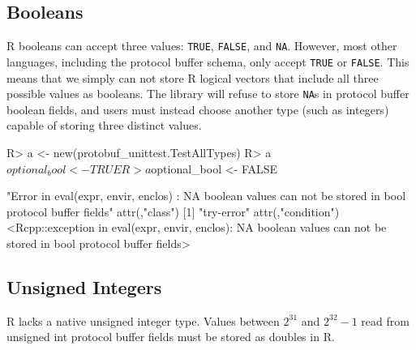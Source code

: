 \documentclass[article]{jss}
\begin{document}
\subsection{Booleans}

R booleans can accept three values: \texttt{TRUE}, \texttt{FALSE}, and
\texttt{NA}.  However, most other languages, including the protocol
buffer schema, only accept \texttt{TRUE} or \texttt{FALSE}.  This means
that we simply can not store R logical vectors that include all three
possible values as booleans.  The library will refuse to store
\texttt{NA}s in protocol buffer boolean fields, and users must instead
choose another type (such as integers) capable of storing three
distinct values.


\begin{Schunk}
\begin{Sinput}
R> a <- new(protobuf_unittest.TestAllTypes)
R> a$optional_bool <- TRUE
R> a$optional_bool <- FALSE
\end{Sinput}
\end{Schunk}
\begin{Schunk}
\end{Schunk}
\begin{Schunk}
\begin{Soutput}
[1] "Error in eval(expr, envir, enclos) : \n  NA boolean values can not be stored in bool protocol buffer fields\n"
attr(,"class")
[1] "try-error"
attr(,"condition")
<Rcpp::exception in eval(expr, envir, enclos): NA boolean values can not be stored in bool protocol buffer fields>
\end{Soutput}
\end{Schunk}

\subsection{Unsigned Integers}

R lacks a native unsigned integer type.  Values between $2^{31}$ and
$2^{32} - 1$ read from unsigned int protocol buffer fields must be
stored as doubles in R.
\end{document}
